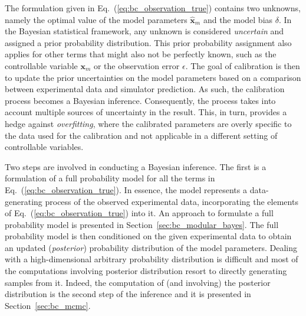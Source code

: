 The formulation given in Eq.~(\ref{eq:bc_observation_true}) contains two unknowns, namely the optimal value of the model parameters $\hat{\bm{x}}_m$ and the model bias $\delta$.
In the Bayesian statistical framework, any unknown is considered \emph{uncertain} and assigned a prior probability distribution.
This prior probability assignment also applies for other terms that might also not be perfectly known, such as the controllable variable $\bm{x}_m$ or the observation error $\epsilon$. 
The goal of calibration is then to update the prior uncertainties on the model parameters based on a comparison between experimental data and simulator prediction.
As such, the calibration process becomes a Bayesian inference.
Consequently, the process takes into account multiple sources of uncertainty in the result. 
This, in turn, provides a hedge against \emph{overfitting}, where the calibrated parameters are overly specific to the data used for the calibration and not applicable in a different setting of controllable variables.

Two steps are involved in conducting a Bayesian inference.
The first is a formulation of a full probability model for all the terms in Eq.~(\ref{eq:bc_observation_true}).
In essence, the model represents a data-generating process of the observed experimental data,
incorporating the elements of Eq.~(\ref{eq:bc_observation_true}) into it.
An approach to formulate a full probability model is presented in Section~\ref{sec:bc_modular_bayes}.
The full probability model is then conditioned on the given experimental data to obtain an updated (\emph{posterior}) probability distribution of the model parameters.
Dealing with a high-dimensional arbitrary probability distribution is difficult and most of the computations involving  posterior distribution resort to directly generating samples from it. 
Indeed, the computation of (and involving) the posterior distribution is the second step of the inference and it is presented in Section~\ref{sec:bc_mcmc}.


